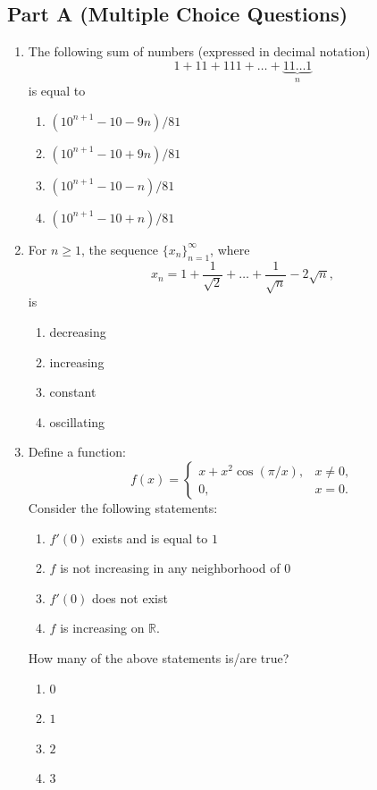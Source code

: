 \documentclass[11pt, a4paper]{article}
\begin{document}
\subsection*{Part A (Multiple Choice Questions)}
\begin{enumerate}
  \item The following sum of numbers (expressed in decimal notation)
  \[
    1 + 11 + 111 + \dots + \underbrace{11\dots 1}_{n}
  \]
  is equal to
  \begin{enumerate}[label=(\alph*)]
    \item $(10^{n+1} - 10 - 9n)/81$
    \item $(10^{n+1} - 10 + 9n)/81$
    \item $(10^{n+1} - 10 - n)/81$
    \item $(10^{n+1} - 10 + n)/81$
  \end{enumerate}

  \item For $n \ge 1$, the sequence $\{x_n\}_{n=1}^\infty$, where
  \[
    x_n = 1 + \frac{1}{\sqrt{2}} + \dots + \frac{1}{\sqrt{n}} - 2\sqrt{n},
  \]
  is
  \begin{enumerate}[label=(\alph*)]
    \item decreasing
    \item increasing
    \item constant
    \item oscillating
  \end{enumerate}

  \item Define a function:
  \[
    f(x) = \begin{cases}
      x + x^2 \cos(\pi/x), & x \ne 0, \\
      0, & x = 0.
    \end{cases}
  \]
  Consider the following statements:
  \begin{enumerate}[label=(\roman*)]
    \item $f'(0)$ exists and is equal to $1$
    \item $f$ is not increasing in any neighborhood of $0$
    \item $f'(0)$ does not exist
    \item $f$ is increasing on $\mathbb{R}$.
  \end{enumerate}
  How many of the above statements is/are true?
  \begin{enumerate}[label=(\alph*)]
    \item $0$
    \item $1$
    \item $2$
    \item $3$
  \end{enumerate}


\end{enumerate}
\end{document}
